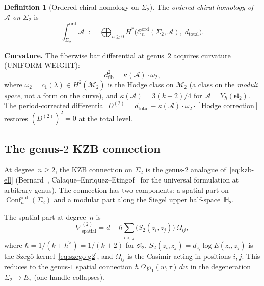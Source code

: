 \documentclass[11pt,reqno]{amsart}
\theoremstyle{definition}
\newtheorem{definition}[theorem]{Definition}
\theoremstyle{remark}
\newcommand{\cA}{\mathcal{A}}
\newcommand{\cC}{\mathcal{C}}
\newcommand{\cM}{\mathcal{M}}
\DeclareMathOperator{\Conf}{Conf}
\newcommand{\HHH}{\mathbb{H}}
\numberwithin{equation}{section}
\begin{document}
\begin{definition}[Ordered chiral homology on $\Sigma_2$]
\label{def:ord-ch-g2}
The \emph{ordered chiral homology of $\cA$ on $\Sigma_2$} is
\begin{equation}\label{eq:ord-ch-g2}
  \int_{\Sigma_2}^{\mathrm{ord}} \cA
  \;:=\;
  \bigoplus_{n \geq 0}
  H^*\bigl(
  \cC_n^{\mathrm{ord}}(\Sigma_2, \cA),\;
  d_{\mathrm{total}}\bigr).
\end{equation}
\end{definition}

\noindent
\textbf{Curvature.}
The fiberwise bar differential at genus~$2$ acquires
curvature (UNIFORM-WEIGHT):
\begin{equation}\label{eq:fib-curvature-g2}
  d_{\mathrm{fib}}^2 = \kappa(\cA) \cdot \omega_2,
\end{equation}
where $\omega_2 = c_1(\lambda) \in H^2(\overline{\cM}_2)$
is the Hodge class on $\overline{\cM}_2$
(a class on the \emph{moduli space}, not a form on the
curve), and $\kappa(\cA) = 3(k+2)/4$ for
$\cA = Y_\hbar(\mathfrak{sl}_2)$. The period-corrected
differential
$D^{(2)} = d_{\mathrm{total}} - \kappa(\cA) \cdot
\omega_2 \cdot [\text{Hodge correction}]$ restores
$(D^{(2)})^2 = 0$ at the total level.

\subsection{The genus-$2$ KZB connection}
\label{subsec:g2-kzb}

At degree~$n \geq 2$, the KZB connection on $\Sigma_2$
is the genus-$2$ analogue of~\eqref{eq:kzb-ell}
(Bernard~\cite{Bernard88},
Calaque--Enriquez--Etingof~\cite{CEE09} for the
universal formulation at arbitrary genus).
The connection has two components: a spatial part on
$\Conf_n^{\mathrm{ord}}(\Sigma_2)$ and a modular part
along the Siegel upper half-space~$\HHH_2$.

The spatial part at degree~$n$ is
\begin{equation}\label{eq:kzb-g2-spatial}
  \nabla^{(2)}_{\mathrm{spatial}}
  = d
  - \hbar \sum_{i < j}
  \bigl(S_2(z_i, z_j)\bigr)\,\Omega_{ij},
\end{equation}
where $\hbar = 1/(k + h^\vee) = 1/(k+2)$ for
$\mathfrak{sl}_2$, $S_2(z_i, z_j) = d_{z_i}\log E(z_i, z_j)$
is the Szeg\H{o} kernel~\eqref{eq:szego-g2},
and $\Omega_{ij}$ is the Casimir acting in positions
$i, j$. This reduces to the genus-$1$ spatial connection
$\hbar\,\Omega\,\wp_1(w, \tau)\,dw$ in the degeneration
$\Sigma_2 \to E_\tau$ (one handle collapses).
\end{document}
